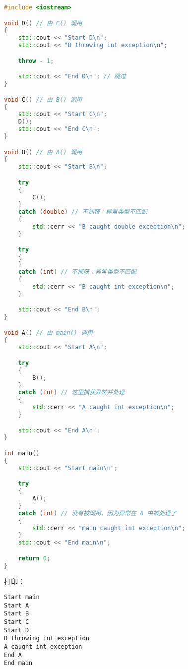 \documentclass[../../LearnCpp.tex]{subfiles}
\begin{document}
\begin{lstlisting}[language=C++]
#include <iostream>

void D() // 由 C() 调用
{
    std::cout << "Start D\n";
    std::cout << "D throwing int exception\n";

    throw - 1;

    std::cout << "End D\n"; // 跳过
}

void C() // 由 B() 调用
{
    std::cout << "Start C\n";
    D();
    std::cout << "End C\n";
}

void B() // 由 A() 调用
{
    std::cout << "Start B\n";

    try
    {
        C();
    }
    catch (double) // 不捕获：异常类型不匹配
    {
        std::cerr << "B caught double exception\n";
    }

    try
    {
    }
    catch (int) // 不捕获：异常类型不匹配
    {
        std::cerr << "B caught int exception\n";
    }

    std::cout << "End B\n";
}

void A() // 由 main() 调用
{
    std::cout << "Start A\n";

    try
    {
        B();
    }
    catch (int) // 这里捕获异常并处理
    {
        std::cerr << "A caught int exception\n";
    }

    std::cout << "End A\n";
}

int main()
{
    std::cout << "Start main\n";

    try
    {
        A();
    }
    catch (int) // 没有被调用，因为异常在 A 中被处理了
    {
        std::cerr << "main caught int exception\n";
    }
    std::cout << "End main\n";

    return 0;
}
\end{lstlisting}

打印：

\begin{lstlisting}
Start main
Start A
Start B
Start C
Start D
D throwing int exception
A caught int exception
End A
End main
\end{lstlisting}
\end{document}
